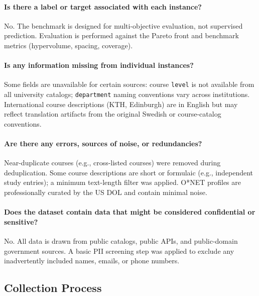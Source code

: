 \paragraph{Is there a label or target associated with each instance?}
No. The benchmark is designed for multi-objective evaluation, not supervised prediction. Evaluation is performed against the Pareto front and benchmark metrics (hypervolume, spacing, coverage).

\paragraph{Is any information missing from individual instances?}
Some fields are unavailable for certain sources: course \texttt{level} is not available from all university catalogs; \texttt{department} naming conventions vary across institutions.
International course descriptions (KTH, Edinburgh) are in English but may reflect translation artifacts from the original Swedish or course-catalog conventions.

\paragraph{Are there any errors, sources of noise, or redundancies?}
Near-duplicate courses (e.g., cross-listed courses) were removed during deduplication. Some course descriptions are short or formulaic (e.g., independent study entries); a minimum text-length filter was applied. O*NET profiles are professionally curated by the US DOL and contain minimal noise.

\paragraph{Does the dataset contain data that might be considered confidential or sensitive?}
No. All data is drawn from public catalogs, public APIs, and public-domain government sources. A basic PII screening step was applied to exclude any inadvertently included names, emails, or phone numbers.

\subsection{Collection Process}


